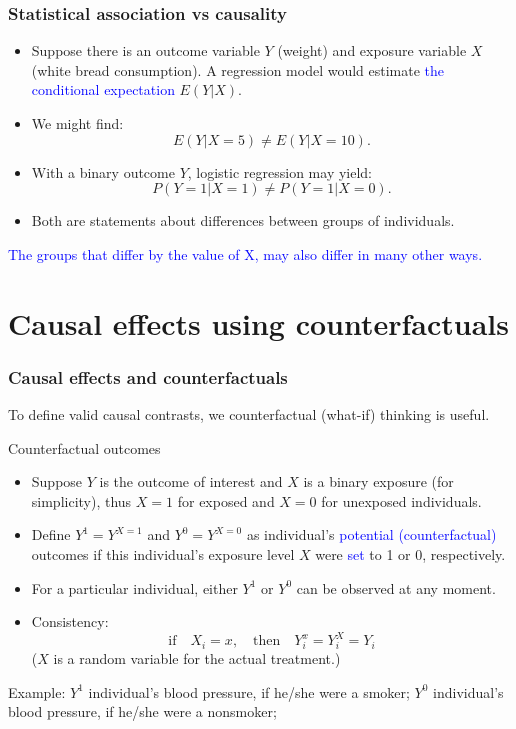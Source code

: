 \documentclass[10pt,dvipsnames,t,handout%
,aspectratio=169%
]{beamer}%
\newcommand{\sini}[1]{\textcolor{Blue}{#1}}
\newcommand{\puna}[1]{\textcolor{BrickRed}{#1}}
\begin{document}
\begin{frame}
	\frametitle{Statistical association vs causality}
	\begin{itemize}
\item Suppose there is an outcome variable $Y$ (weight) and exposure variable $X$ (white bread consumption). 
A regression model would estimate \sini{the conditional expectation} $E(Y|X)$. 
\item We might find: $$E(Y|X=5) \ne E(Y|X=10).$$
\item With a binary outcome $Y$, logistic regression may yield: 
$$P(Y=1|X=1)\ne P(Y=1|X=0).$$
\item Both are statements about differences between groups of individuals. 
\end{itemize}
\sini{The groups that differ by the value of X, may also differ in many other ways. }
\end{frame}

\section{Causal effects using counterfactuals}

\begin{frame}
\frametitle{Causal effects and counterfactuals}


To define valid causal contrasts, we \puna{counterfactual} (what-if) thinking is useful.
\begin{block}{Counterfactual outcomes}
\begin{itemize}
\item Suppose $Y$ is the outcome of interest and  $X$ is a binary exposure (for simplicity), thus $X=1$ for exposed and $X=0$ for unexposed individuals.
\item Define $Y^1=Y^{X=1}$ and $Y^0=Y^{X=0}$  as individual's \sini{potential (counterfactual)} outcomes if this individual's exposure level $X$ were \sini{set} to 1 or 0, respectively. 
\item For a particular individual, either $Y^1$ or $Y^0$ can be observed at any moment. 
\item Consistency: 
$$\text{if} \quad X_i=x, \quad \text{then} \quad Y_i^x=Y_i^X=Y_i$$
($X$ is a random variable for the actual treatment.)
\end{itemize}
\end{block}
Example: $Y^1$ individual's blood pressure, if he/she were a smoker; $Y^0$ individual's blood pressure, if he/she were a nonsmoker;

\end{frame}
\end{document}
